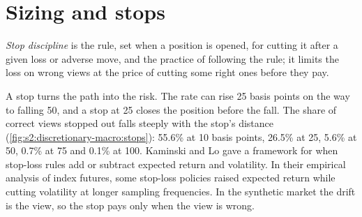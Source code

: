 \begin{omfigure}

\label{fig:s2:discretionary-macro:expressions}
\end{omfigure}

\section{Sizing and stops}

\begin{definition}\label{def:s2:discretionary-macro:stop}
\emph{Stop discipline} is the rule, set when a position is opened, for cutting it after a given loss or adverse move, and the
practice of following the rule; it limits the loss on wrong views at the price of cutting some right ones before they pay.
\end{definition}

A stop turns the path into the risk. The rate can rise 25 basis points on the way to falling 50, and a stop at 25 closes the position before the fall.
The share of correct views stopped out falls steeply with the stop's distance (\cref{fig:s2:discretionary-macro:stops}): 55.6\% at 10 basis points,
26.5\% at 25, 5.6\% at 50, 0.7\% at 75 and 0.1\% at 100. Kaminski and Lo gave a framework for when stop-loss rules add or subtract expected return
and volatility. In their empirical analysis of index futures, some stop-loss policies raised expected return while cutting volatility at longer
sampling frequencies. In the synthetic market the drift is the view, so the stop pays only when the view is wrong.

